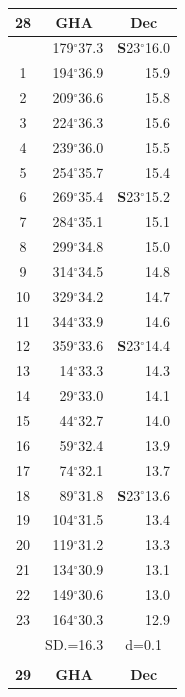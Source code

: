 \documentclass[10pt, a4paper]{report}
\begin{document}
\begin{scriptsize}
\noindent
\begin{tabular*}{0.2\textwidth}[t]{@{\extracolsep{\fill}}|c|rr|}
\hline
\multicolumn{1}{|c|}{\rule{0pt}{2.6ex}\textbf{28}} & \multicolumn{1}{c}{\textbf{GHA}} & \multicolumn{1}{c|}{\textbf{Dec}}\\
\hline\rule{0pt}{2.6ex}\noindent
0 & 179$^\circ$37.3 & \textbf{S}23$^\circ$16.0\\
1 & 194$^\circ$36.9 & 15.9\\
2 & 209$^\circ$36.6 & 15.8\\
3 & 224$^\circ$36.3 & \raisebox{0.24ex}{\boldmath$\cdot$~\boldmath$\cdot$~~}15.6\\
4 & 239$^\circ$36.0 & 15.5\\
5 & 254$^\circ$35.7 & 15.4\\[2Pt]
6 & 269$^\circ$35.4 & \textbf{S}23$^\circ$15.2\\
7 & 284$^\circ$35.1 & 15.1\\
8 & 299$^\circ$34.8 & 15.0\\
9 & 314$^\circ$34.5 & \raisebox{0.24ex}{\boldmath$\cdot$~\boldmath$\cdot$~~}14.8\\
10 & 329$^\circ$34.2 & 14.7\\
11 & 344$^\circ$33.9 & 14.6\\[2Pt]
12 & 359$^\circ$33.6 & \textbf{S}23$^\circ$14.4\\
13 & 14$^\circ$33.3 & 14.3\\
14 & 29$^\circ$33.0 & 14.1\\
15 & 44$^\circ$32.7 & \raisebox{0.24ex}{\boldmath$\cdot$~\boldmath$\cdot$~~}14.0\\
16 & 59$^\circ$32.4 & 13.9\\
17 & 74$^\circ$32.1 & 13.7\\[2Pt]
18 & 89$^\circ$31.8 & \textbf{S}23$^\circ$13.6\\
19 & 104$^\circ$31.5 & 13.4\\
20 & 119$^\circ$31.2 & 13.3\\
21 & 134$^\circ$30.9 & \raisebox{0.24ex}{\boldmath$\cdot$~\boldmath$\cdot$~~}13.1\\
22 & 149$^\circ$30.6 & 13.0\\
23 & 164$^\circ$30.3 & 12.9\\
\hline
\rule{0pt}{2.4ex} & \multicolumn{1}{c}{SD.=16.3} & \multicolumn{1}{c|}{d=0.1}\\
\hline
\multicolumn{1}{c}{}\\[-0.5ex]\hline
\multicolumn{1}{|c|}{\rule{0pt}{2.6ex}\textbf{29}} & \multicolumn{1}{c}{\textbf{GHA}} & \multicolumn{1}{c|}{\textbf{Dec}}\\

\end{tabular*}
\end{scriptsize}
\end{document}
